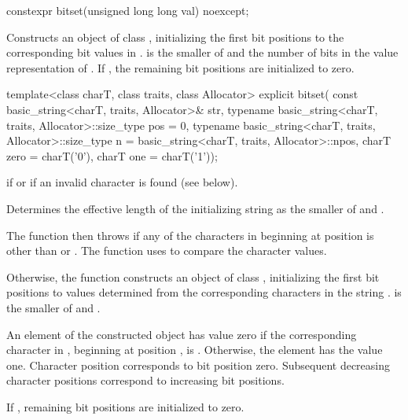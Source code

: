 %
\begin{itemdecl}
constexpr bitset(unsigned long long val) noexcept;
\end{itemdecl}

\begin{itemdescr}
\pnum
\effects
Constructs an object of class
,
initializing the first  bit positions to the corresponding bit
values in .
 is the smaller of  and the number of bits in the value
representation of .
If , the remaining bit positions are initialized to zero.
\end{itemdescr}

%
\begin{itemdecl}
template<class charT, class traits, class Allocator>
  explicit bitset(
    const basic_string<charT, traits, Allocator>& str,
    typename basic_string<charT, traits, Allocator>::size_type pos = 0,
    typename basic_string<charT, traits, Allocator>::size_type n
      = basic_string<charT, traits, Allocator>::npos,
    charT zero = charT('0'),
    charT one = charT('1'));
\end{itemdecl}

\begin{itemdescr}
\pnum
\throws
{}
if
or  if an invalid character is found (see below).%

\pnum
\effects
Determines the effective length
 of the initializing string as the smaller of
 and
.

The function then throws%
if any of the 
characters in  beginning at position  is
other than  or . The function uses 
to compare the character values.

Otherwise, the function constructs an object of class
,
initializing the first  bit
positions to values determined from the corresponding characters in the string
.
 is the smaller of  and .

\pnum
An element of the constructed object has value zero if the
corresponding character in , beginning at position
, is
.
Otherwise, the element has the value one.
Character position  corresponds to bit position zero.
Subsequent decreasing character positions correspond to increasing bit positions.

\pnum
If , remaining bit positions are initialized to zero.
\end{itemdescr}

